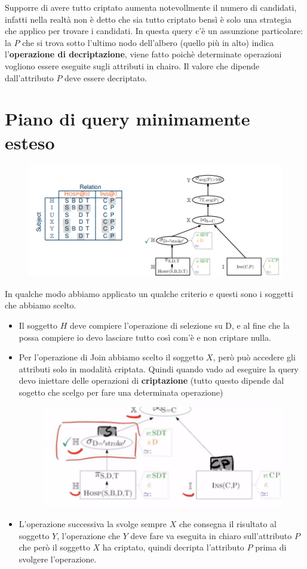 \documentclass{report}
\begin{document}
\noindent Supporre di avere tutto criptato aumenta notevollmente il numero di candidati, infatti nella realtà non è detto che sia tutto criptato bensì
è solo una strategia che applico per trovare i candidati.
In questa query c'è un assunzione particolare: la $P$ che si trova sotto l'ultimo nodo dell'albero (quello più in alto) indica l'\textbf{operazione di decriptazione},
viene fatto poichè determinate operazioni vogliono essere eseguite sugli attributi in chairo. Il valore che dipende dall'attributo $P$ deve essere decriptato.

\section{Piano di query minimamente esteso}
\begin{figure}[H]
    \centering
    \includegraphics[width=0.8\linewidth]{images/minimal.png}
\end{figure}

In qualche modo abbiamo applicato un qualche criterio e questi sono i soggetti che abbiamo scelto.
\begin{itemize}
    \item Il soggetto $H$ deve compiere l'operazione di selezione su D, e al fine che la possa compiere io devo lasciare tutto così com'è e non criptare nulla.
    \item Per l'operazione di Join abbiamo scelto il soggetto $X$, però può accedere gli attributi solo in modalità criptata. Quindi quando vado ad eseguire la query devo iniettare delle operazioni di \textbf{criptazione} (tutto questo dipende dal sogetto che scelgo per fare una determinata operazione)
    \begin{figure}[H]
    \centering
    \includegraphics[width=0.4\linewidth]{images/onthefly.png}
\end{figure}
    \item L'operazione successiva la svolge sempre $X$ che consegna il risultato al soggetto $Y$, l'operazione che $Y$ deve fare va eseguita in chiaro
    sull'attributo $P$ che però il soggetto $X$ ha criptato, quindi decripta l'attributo $P$ prima di svolgere l'operazione.
\end{itemize}
\end{document}
